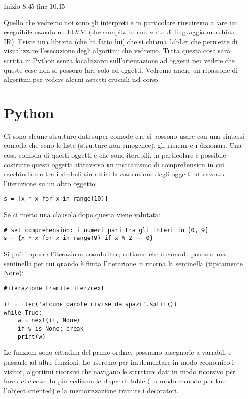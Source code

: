 Inizio 8.45 fine 10.15

Quello che vedremo noi sono gli interpreti e in particolare riusciremo a fare un eseguibile usando un LLVM (che compila in una sorta di linguaggio macchina IR).
Esiste una libreria (che ha fatto lui) che si chiama LibLet che permette di visualizzare l'esecuzione degli algoritmi che vedremo. Tutta questa cosa sarà scritta in Python senza focalizzarci sull'orientazione ad oggetti per vedere che queste cose non si possono fare solo ad oggetti.
Vedremo anche un ripassone di algoritmi per vedere alcuni aspetti cruciali nel corso.

\section{Python}
Ci sono alcune strutture dati super comode che si possono usare con una sintassi comoda che sono le liste (strutture non omogenee), gli insiemi e i dizionari. Una cosa comoda di questi oggetti è che sono iterabili, in particolare è possibile costruire questi oggetti attraverso un meccanismo di comprehension in cui racchiudiamo tra i simboli sintattici la costruzione degli oggetti attraverso l'iterazione su un altro oggetto:

\begin{lstlisting} 
s = [x * x for x in range(10)]
\end{lstlisting}

Se ci metto una clausola dopo questa viene valutata:
\begin{lstlisting} 
# set comprehension: i numeri pari tra gli interi in [0, 9]
s = {x * x for x in range(9) if x % 2 == 0}
\end{lstlisting}

Si può imporre l'iterazione usando iter, notiamo che è comodo passare una sentinella per cui quando è finita l'iterazione ci ritorna la sentinella (tipicamente None):
\begin{lstlisting}
#iterazione tramite iter/next

it = iter('alcune parole divise da spazi'.split())
while True:
    w = next(it, None)
    if w is None: break
    print(w)
\end{lstlisting}

Le funzioni sono cittadini del primo ordine, possiamo assegnarle a variabili e passarle ad altre funzioni.
Le useremo per implementare in modo economico i visitor, algoritmi ricorsivi che navigano le strutture dati in modo ricorsivo per fare delle cose. In più vediamo le dispatch table (un modo comodo per fare l'object oriented) e la memorizzazione tramite i decoratori.

